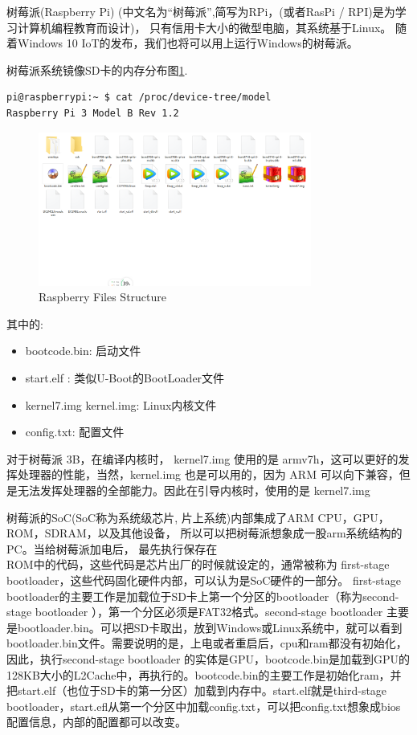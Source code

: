 树莓派(Raspberry Pi) (中文名为“树莓派”,简写为RPi，(或者RasPi / RPI)是为学习计算机编程教育而设计)，
只有信用卡大小的微型电脑，其系统基于Linux。
随着Windows 10 IoT的发布，我们也将可以用上运行Windows的树莓派。
\par 树莓派系统镜像SD卡的内存分布图\ref{raspberryFiles}. 
\begin{lstlisting}[title=查看树莓派所属型号]
pi@raspberrypi:~ $ cat /proc/device-tree/model
Raspberry Pi 3 Model B Rev 1.2
\end{lstlisting}
\begin{figure}[htpb]
    \centering
    \includegraphics[width=0.8\textwidth]{pictures/raspberryFiles.png}
    \caption{Raspberry Files Structure}
    \label{raspberryFiles}
\end{figure}
其中的:
\begin{itemize}
    \item bootcode.bin: 启动文件
    \item start.elf : 类似U-Boot的BootLoader文件
    \item kernel7.img kernel.img: Linux内核文件
    \item config.txt: 配置文件
\end{itemize}
\par 对于树莓派 3B，在编译内核时，
kernel7.img 使用的是 armv7h，这可以更好的发挥处理器的性能，当然，kernel.img 也是可以用的，因为 ARM 可以向下兼容，但是无法发挥处理器的全部能力。因此在引导内核时，使用的是 kernel7.img
\par 树莓派的SoC(SoC称为系统级芯片, 片上系统)内部集成了ARM CPU，GPU，ROM，SDRAM，以及其他设备，
所以可以把树莓派想象成一股arm系统结构的PC。当给树莓派加电后，
最先执行保存在\\ROM中的代码，这些代码是芯片出厂的时候就设定的，通常被称为 first-stage bootloader，这些代码固化硬件内部，可以认为是SoC硬件的一部分。
first-stage bootloader的主要工作是加载位于SD卡上第一个分区的bootloader（称为second-stage bootloader ），第一个分区必须是FAT32格式。second-stage bootloader 主要是bootloader.bin。可以把SD卡取出，放到Windows或Linux系统中，就可以看到bootloader.bin文件。需要说明的是，上电或者重启后，cpu和ram都没有初始化，因此，执行second-stage bootloader 的实体是GPU，bootcode.bin是加载到GPU的128KB大小的L2Cache中，再执行的。bootcode.bin的主要工作是初始化ram，并把start.elf（也位于SD卡的第一分区）加载到内存中。start.elf就是third-stage bootloader，start.efl从第一个分区中加载config.txt，可以把config.txt想象成bios配置信息，内部的配置都可以改变。


